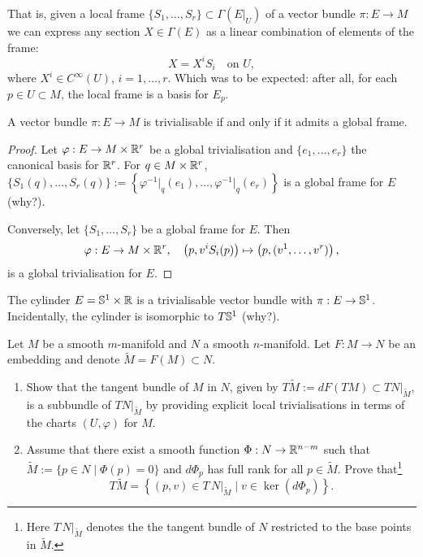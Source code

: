 That is, given a local frame $\{S_1, \ldots, S_r\}\subset\Gamma(E|_U)$ of a vector bundle $\pi: E \to M$ we can express any section $X\in\Gamma(E)$ as a linear combination of elements of the frame:
\begin{equation}
  X = X^i S_i \quad\mbox{on }U,
\end{equation}
where $X^i\in C^\infty(U)$, $i=1,\ldots,r$.
Which was to be expected: after all, for each $p\in U\subset M$, the local frame is a basis for $E_p$.

\begin{proposition}\label{prop:trivialisable}
  A vector bundle $\pi: E\to M$ is trivialisable if and only if it admits a global frame.
\end{proposition}
\begin{proof}
  Let $\varphi: E \to M\times\mathbb{R}^r$ be a global trivialisation and $\{e_1, \ldots, e_r\}$ the canonical basis for $\mathbb{R}^r$.
  For $q\in M\times\mathbb{R}^r$, $\{S_1(q), \ldots, S_r(q)\} := \left\{\varphi^{-1}\big|_q(e_1), \ldots, \varphi^{-1}\big|_q(e_r) \right\}$ is a global frame for $E$ (why?).

  Conversely, let $\{S_1, \ldots, S_r\}$ be a global frame for $E$. Then
  \begin{equation}
    \varphi: E \to M\times\mathbb{R}^r, \quad
    \left(p, v^i S_i(p)\right) \mapsto \left(p, (v^1, \ldots, v^r)\right),
  \end{equation}
  is a global trivialisation for $E$.
\end{proof}

\begin{example}
  The cylinder $E = \mathbb{S}^1\times\mathbb{R}$ is a trivialisable vector bundle with $\pi:E\to \mathbb{S}^1$.
  Incidentally, the cylinder is isomorphic to $T\mathbb{S}^1$ (why?).
\end{example}

\begin{exercise}
  Let $M$ be a smooth $m$-manifold and $N$ a smooth $n$-manifold.
  Let $F:M\to N$ be an embedding and denote $\widetilde M = F(M)\subset N$.
  \begin{enumerate}
    \item Show that the tangent bundle of $M$ in $N$, given by $T\widetilde M := dF(TM) \subset TN\big|_{\widetilde M}$, is a subbundle of $TN\big|_{\widetilde M}$ by providing explicit local trivialisations in terms of the charts $(U, \varphi)$ for $M$.
    \item Assume that there exist a smooth function $\Phi:N\to\mathbb{R}^{n-m}$ such that $\widetilde M := \{p\in N \mid \Phi(p) = 0\}$ and $d\Phi_p$ has full rank for all $p\in\widetilde M$. Prove that\footnote{Here $T\,N|_{\widetilde{M}}$ denotes the the tangent bundle of $N$ restricted to the base points in $\widetilde{M}$.}
      \begin{equation}
        T\widetilde{M} = \left\{(p,v)\in T\,N|_{\widetilde{M}} \mid v\in\ker(d\Phi_p)\right\}.
      \end{equation}
  \end{enumerate}
\end{exercise}

